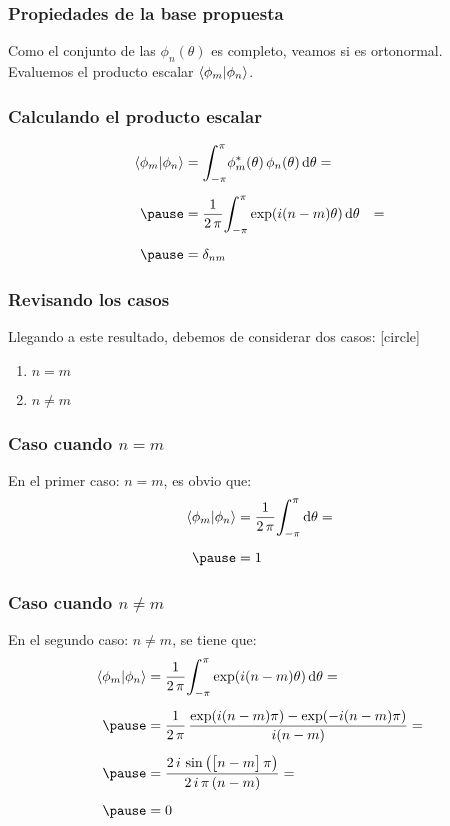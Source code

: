 \documentclass[12pt]{beamer}
\begin{document}
\begin{frame}
\frametitle{Propiedades de la base propuesta}
Como el conjunto de las $\phi_{n}(\theta)$ es completo, \pause veamos si es ortonormal.
\\
\bigskip
\pause
Evaluemos el producto escalar $\ip{\phi_{m}}{\phi_{n}}$.
\end{frame}
\begin{frame}
\frametitle{Calculando el producto escalar}
\begin{eqnarray*}
\begin{aligned}
\ip{\phi_{m}}{\phi_{n}} &= \scaleint{6ex}_{\bs - \pi}^{\pi} \phi_{m}^{*} (\theta) \, \phi_{n} (\theta) \dd{\theta} = \\[0.5em] \pause
&= \dfrac{1}{2 \, \pi} \scaleint{6ex}_{\bs - \pi}^{\pi} \exp(i (n -m )\theta) \dd{\theta} &= \\[0.5em] \pause
&= \delta_{nm}
\end{aligned}
\end{eqnarray*}
\end{frame}
\begin{frame}
\frametitle{Revisando los casos}
Llegando a este resultado, debemos de considerar dos casos:
[circle]
\begin{enumerate}[<+->]
\item $n = m$
\item $n \neq m$
\end{enumerate}
\end{frame}
\begin{frame}
\frametitle{Caso cuando $n = m$}
En el primer caso: $n = m$, es obvio que:
\pause
\begin{eqnarray*}
\begin{aligned}
\ip{\phi_{m}}{\phi_{n}} &= \dfrac{1}{2 \, \pi} \scaleint{6ex}_{\bs - \pi}^{\pi} \dd{\theta} = \\[0.5em] \pause
&= 1
\end{aligned}
\end{eqnarray*}
\end{frame}
\begin{frame}
\frametitle{Caso cuando $n \neq m$}
En el segundo caso: $n \neq m$, se tiene que:
\pause
\begin{eqnarray*}
\begin{aligned}
\ip{\phi_{m}}{\phi_{n}} &= \dfrac{1}{2 \, \pi} \scaleint{6ex}_{\bs - \pi}^{\pi} \exp(i(n - m) \theta) \dd{\theta} = \\[0.5em] \pause
&= \dfrac{1}{2 \, \pi} \, \dfrac{\exp(i(n - m) \pi) - \exp(-i(n - m) \pi)}{i (n - m)} = \\[0.5em] \pause
&= \dfrac{2 \, i \, \sin \big( \big[ n - m \big] \, \pi \big) }{2 \, i \, \pi \, (n - m)} = \\[0.5em] \pause
&= 0
\end{aligned}
\end{eqnarray*}
\end{frame}
\end{document}
